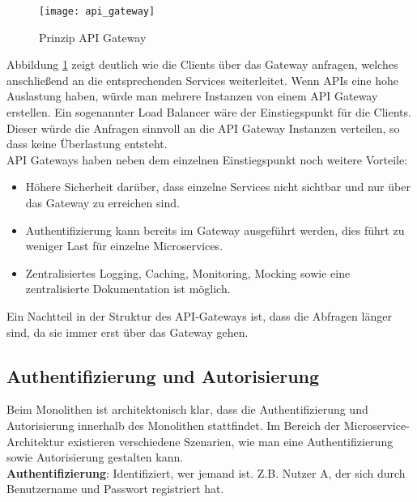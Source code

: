 \begin{figure}[ht]
	\centering
	\texttt{[image: api\_gateway]}
	\caption[Prinzip API Gateway] { Prinzip API Gateway }
	\label{fig:api_gateway}
\end{figure}

Abbildung \ref{fig:api_gateway} zeigt deutlich wie die Clients über das Gateway anfragen, welches anschließend an die entsprechenden Services weiterleitet. Wenn APIs eine hohe Auslastung haben, würde man mehrere Instanzen von einem API Gateway erstellen. Ein sogenannter Load Balancer wäre der Einstiegspunkt für die Clients. Dieser würde die Anfragen sinnvoll an die API Gateway Instanzen verteilen, so dass keine Überlastung entsteht.\cite{oracle} \\

API Gateways haben neben dem einzelnen Einstiegspunkt noch weitere Vorteile: 
\begin{itemize}
	\item Höhere Sicherheit darüber, dass einzelne Services nicht sichtbar und nur über das Gateway zu erreichen sind.\cite{bruce2019mic_in_action}
	\item Authentifizierung kann bereits im Gateway ausgeführt werden, dies führt zu weniger Last für einzelne Microservices.\cite{wolff2018mic_praxis}
	\item Zentralisiertes Logging, Caching, Monitoring, Mocking sowie eine zentralisierte Dokumentation ist möglich.\cite{wolff2018mic_praxis}
\end{itemize}  

Ein Nachtteil in der Struktur des API-Gateways ist, dass die Abfragen länger sind, da sie immer erst über das Gateway gehen.\\

\subsection{Authentifizierung und Autorisierung}\label{sec:authentifizierung_autorisierung}

Beim Monolithen ist architektonisch klar, dass die Authentifizierung und Autorisierung innerhalb des Monolithen stattfindet. Im Bereich der Microservice-Architektur existieren verschiedene Szenarien, wie man eine Authentifizierung sowie Autorisierung gestalten kann.\cite{bruce2019mic_in_action} \\

\textbf{Authentifizierung}: Identifiziert, wer jemand ist. Z.B. Nutzer A, der sich durch Benutzername und Passwort registriert hat.\cite{bruce2019mic_in_action}\\

